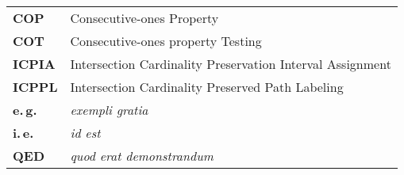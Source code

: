 \abbreviations

\begin{tabular}{ll}
  \textbf{COP}& Consecutive-ones Property \\
  \textbf{COT}& Consecutive-ones property Testing \\
  \textbf{ICPIA}& Intersection Cardinality Preservation Interval
  Assignment \\
  \textbf{ICPPL}& Intersection Cardinality Preserved Path Labeling \\ 
  \textbf{e.\,g.}& {\em exempli gratia} \\ 
  \textbf{i.\,e.}& {\em id est}\\
  \textbf{QED}& {\em quod erat demonstrandum}
  
\end{tabular}